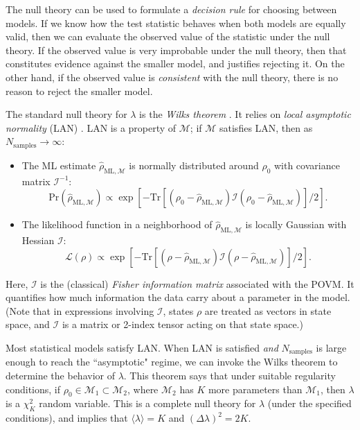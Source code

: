 \documentclass[aps,pra, twocolumn]{revtex4-1}
\newcommand{\M}{\mathcal{M}}
\newcommand{\Fi}{\mathcal{I}}
\newcommand{\rhohat}{\hat{\rho}}
\newcommand{\rhoML}[1]{\rhohat_{\scriptscriptstyle{\mathrm{ML},#1}}}
\begin{document}
The null theory can be used to formulate a \emph{decision rule} for choosing between models. If we know how the test statistic behaves when both models are equally valid, then we can evaluate the observed value of the statistic under the null theory. If the observed value is very improbable under the null theory, then that constitutes evidence against the smaller model, and justifies rejecting it. On the other hand, if the observed value is \emph{consistent} with the null theory, there is no reason to reject the smaller model.

The standard null theory for $\lambda$ is the \emph{Wilks theorem} \cite{Wilks1938}. It relies on \emph{local asymptotic normality} (LAN) \cite{LeCam1970, LeCam1956}. LAN is a property of $\M$; if $\M$ satisfies LAN, then as $N_{\mathrm{samples}}\rightarrow \infty$:
\begin{itemize}[nosep]
\item The ML estimate $\rhoML{\M}$ is normally distributed around $\rho_{0}$ with covariance matrix $\Fi^{-1}$:
\begin{equation}
\label{eq:landist}
\mathrm{Pr}(\rhoML{\M}) \propto \exp\left[-\mathrm{Tr}[(\rho_{0} - \rhoML{\M})\mathcal{I}(\rho_{0} -\rhoML{\M})]/2\right].
\end{equation}
\item The likelihood function in a neighborhood of $\rhoML{\M}$ is locally Gaussian with Hessian $\Fi$:
\begin{equation}
\label{eq:lanl}
\mathcal{L}(\rho) \propto \exp\left[-\mathrm{Tr}[(\rho - \rhoML{\M})\mathcal{I}(\rho - \rhoML{\M})]/2\right].
\end{equation}
\end{itemize}
Here, $\Fi$ is the (classical) \emph{Fisher information matrix} associated with the POVM. It quantifies how much information the data carry about a parameter in the model.  (Note that in expressions involving $\mathcal{I}$, states $\rho$ are treated as vectors in state space, and $\mathcal{I}$ is a matrix or 2-index tensor acting on that state space.)

Most statistical models satisfy LAN.  When LAN is satisfied \emph{and} $N_{\mathrm{samples}}$ is large enough to reach the ``asymptotic" regime, we can invoke the Wilks theorem to determine the behavior of $\lambda$. This theorem says that under suitable regularity conditions, if $\rho_{0}\in \M_{1}\subset \M_{2}$, where $\M_{2}$ has $K$ more parameters than $\M_{1}$, then $\lambda$ is a $\chi^{2}_{K}$ random variable.  This is a complete null theory for $\lambda$ (under the specified conditions), and implies that $\langle \lambda \rangle = K$ and $(\Delta \lambda)^{2} = 2K$.
\end{document}
